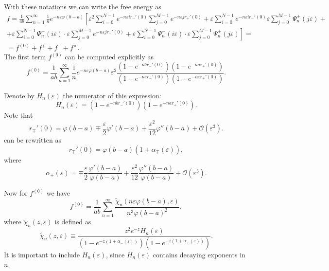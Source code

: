 \documentclass{article}
\begin{document}
With these notations we can write the free energy as
\begin{multline}
  \label{eq:55}
  f=\frac{1}{ab}\sum_{n=1}^{\infty}\frac{1}{n}e^{-n\varepsilon\varphi(b-a)}\left[\varepsilon^{2}\sum_{i=0}^{N-1}e^{-n\varepsilon
    i r_{-}'(0)}\sum_{j=0}^{M-1}e^{-n\varepsilon j
    r_{+}'(0)}+\varepsilon\sum_{i=0}^{N-1}e^{-n\varepsilon i
    r_{-}'(0)}\varepsilon\sum_{j=0}^{M-1}\Psi^{+}_{n}(j\varepsilon)+\right.\\
\left. +\varepsilon\sum_{i=0}^{N-1}\Psi^{-}_{n}(i\varepsilon) \cdot\varepsilon\sum_{j=0}^{M-1}e^{-n\varepsilon
  j r_{+}'(0)}+\varepsilon\sum_{i=0}^{N-1}\Psi^{-}_{n}(i\varepsilon)
\cdot\varepsilon\sum_{j=0}^{M-1}\Psi^{+}_{n}(j\varepsilon)\right]=\\
=f^{(0)}+f^{+}+f^{-}+f^{\times}.
\end{multline}
The first term $f^{(0)}$ can be computed explicitly as
\begin{equation}
  \label{eq:56}
  f^{(0)}=\frac{1}{ab}\sum_{n=1}^{\infty}\frac{1}{n} e^{-n\varepsilon
    \varphi(b-a)}\varepsilon^{2}\frac{\left(1-e^{-n b r_{-}'(0)}\right)\left(1-e^{-n a
        r_{+}'(0)}\right)}{\left(1-e^{-n\varepsilon r_{-}'(0)}\right)\left(1-e^{-n\varepsilon r_{+}'(0)}\right)}.
\end{equation}

Denote by $H_{n}(\varepsilon)$ the numerator of this expression:
\begin{equation}
  \label{eq:57}
  H_{n}(\varepsilon)=\left(1-e^{-n b r_{-}'(0)}\right)\left(1-e^{-n a r_{+}'(0)}\right).
\end{equation}
Note that
\begin{equation}
  \label{eq:58}
  r_{\mp}'(0)=\varphi(b-a)\mp \frac{\varepsilon}{2} \varphi'(b-a)+\frac{\varepsilon^{2}}{12} \varphi''(b-a)+\mathcal{O}(\varepsilon^{3}).
\end{equation}
can be rewritten as
\begin{equation}
  \label{eq:59}
  r_{\mp}'(0)=\varphi(b-a)\left(1+\alpha_{\mp}(\varepsilon)\right), 
\end{equation}
where
\begin{equation}
  \label{eq:60}
  \alpha_{\mp}(\varepsilon)=\mp
  \frac{\varepsilon}{2}\frac{\varphi'(b-a)}{\varphi(b-a)}+\frac{\varepsilon^{2}}{12} \frac{\varphi''(b-a)}{\varphi(b-a)}+\mathcal{O}(\varepsilon^{3}).
\end{equation}

Now for $f^{(0)}$ we have
\begin{equation}
  \label{eq:61}
  f^{(0)}=\frac{1}{ab}\sum_{n=1}^{\infty} \frac{\tilde{\chi}_{n}\left(n\varepsilon
      \varphi(b-a),\varepsilon\right) }{n^{3}\varphi(b-a)^{2}},
\end{equation}
where $\tilde{\chi}_{n}(z,\varepsilon)$  is defined as
\begin{equation}
  \label{eq:62}
  \tilde{\chi}_{n}(z,\varepsilon)\equiv \frac{z^{2} e^{-z}
    H_{n}(\varepsilon)}{\left(1-e^{-z\left(1+\alpha_{-}(\varepsilon)\right)}\right)
    \left(1-e^{-z\left(1+\alpha_{+}(\varepsilon)\right)}\right)}.
\end{equation}
It is important to include $H_{n}(\varepsilon)$, since $H_{n}(\varepsilon)$ contains decaying
exponents in $n$.
\end{document}
